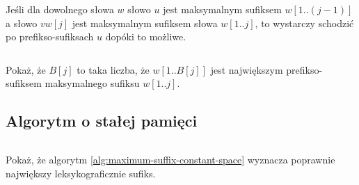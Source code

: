 \begin{corollary}{}{}
  Jeśli dla dowolnego słowa $w$ słowo $u$ jest maksymalnym sufiksem $w[1..(j - 1)]$ a słowo $v w[j]$ jest maksymalnym sufiksem słowa $w[1..j]$, to wystarczy schodzić po prefikso-sufiksach $u$ dopóki to możliwe.
\end{corollary}

\begin{code}
\inputminted{python}{code/maximum-suffix/from-prefix-suffix.py}
\label{alg:maximum-suffix-from-prefix-suffix}
\end{code}

\begin{problem}{}{}
  Pokaż, że $B[j]$ to taka liczba, że $w[1..B[j]]$ jest największym prefikso-sufiksem maksymalnego sufiksu $w[1..j]$.
\end{problem}

\subsection{Algorytm o stałej pamięci}

\begin{code}
\inputminted{python}{code/maximum-suffix/constant-space.py}
\label{alg:maximum-suffix-constant-space}
\end{code}

\begin{problem}{}{}
  Pokaż, że algorytm \ref{alg:maximum-suffix-constant-space} wyznacza poprawnie największy leksykograficznie sufiks.
\end{problem}
